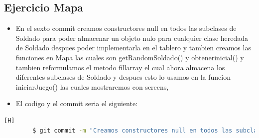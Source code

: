 \documentclass{article}
\begin{document}
	\subsection{Ejercicio Mapa}
	\begin{itemize}	
		\item En el sexto commit creamos constructores null en todos las subclases de Soldado  para poder almacenar un objeto nulo para cualquier clase heredada de Soldado despues poder implementarla en el tablero y tambien creamos las funciones en Mapa las cuales son getRandomSoldado() y obtenerinicial() y tambien reformulamos el metodo fillarray el cual ahora almacena los diferentes subclases de Soldado y despues esto lo usamos en la funcion iniciarJuego() las cuales mostraremos con screens,
		\item El codigo y el commit seria el siguiente:
	\end{itemize}	
	\begin{lstlisting}[language=bash,caption={Commit}][H]
		$ git commit -m "Creamos constructores null en todos las subclases de Soldado  para poder almacenar un objeto nulo para cualquier clase heredada de Soldado despues poder implementarla en el tablero y tambien creamos las funciones en Mapa las cuales son getRandomSoldado() y obtenerinicial() y tambien reformulamos el metodo fillarray el cual ahora almacena los diferentes subclases de Soldado y despues esto lo usamos en la funcion iniciarJuego() las cuales mostraremos con screens"
	\end{lstlisting}	
\end{document}
